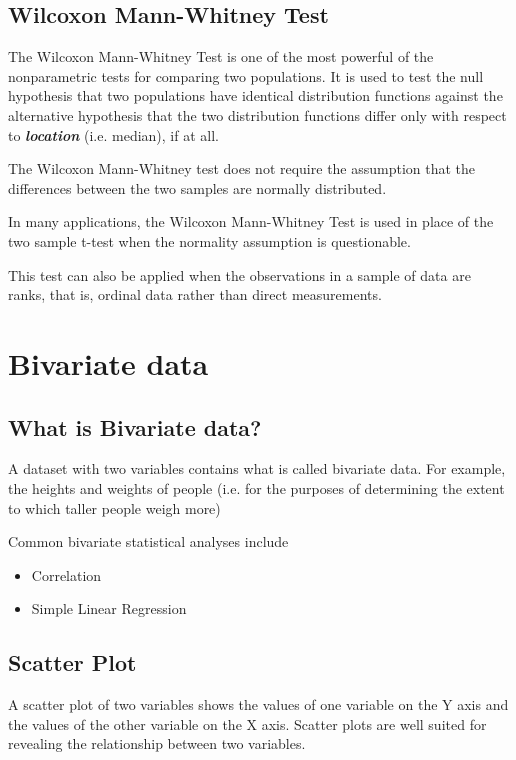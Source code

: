 \documentclass[a4paper,12pt]{article}
\begin{document}
\subsection{Wilcoxon Mann-Whitney Test}
The Wilcoxon Mann-Whitney Test is one of the most powerful of the nonparametric tests for comparing two populations. It is used to test the null hypothesis that two populations have identical distribution functions against the alternative hypothesis that the two distribution functions differ only with respect to \textbf{\emph{location}} (i.e. median), if at all.

The Wilcoxon Mann-Whitney test does not require the assumption that the differences between the two samples are normally distributed.

In many applications, the Wilcoxon Mann-Whitney Test is used in place of the two sample t-test when the normality assumption is questionable.

This test can also be applied when the observations in a sample of data are ranks, that is, ordinal data rather than direct measurements.

\newpage
\section{Bivariate data}
\subsection{What is Bivariate data?}

A dataset with two variables contains what is called bivariate data. For example, the heights and weights of people (i.e. for the purposes of determining the extent to which taller people weigh more)

Common bivariate statistical analyses include
\begin{itemize}
\item Correlation
\item Simple Linear Regression
\end{itemize}

\subsection{Scatter Plot} A scatter plot of two variables shows the values of one variable on the Y axis and the values of the other variable on the X axis. Scatter plots are well suited for revealing the relationship between two variables.
\end{document}
